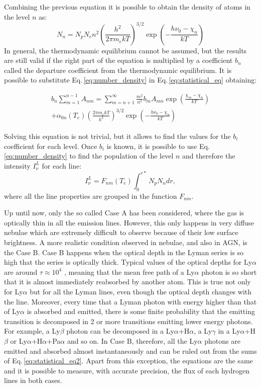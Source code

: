 \documentclass[../main.tex]{subfiles}
\begin{document}
Combining the previous equation it is possible to obtain the density of atoms in the level $n$ as:
\begin{equation}
    \label{eq:number_density}
    N_n = N_pN_en^2\left(\frac{h^2}{2\pi m_e k T}\right)^{3/2} \exp\left(-\frac{h\nu_0 -\chi_n}{kT}\right)
\end{equation}
In general, the thermodynamic equilibrium cannot be assumed, but the results are still valid if the right part of the equation is multiplied by a coefficient $b_n$ called the departure coefficient from the thermodynamic equilibrium. It is possible to substitute Eq.\,\ref{eq:number_density} in Eq.\,\ref{eq:statistical_eq} obtaining:

\begin{multline}
    \label{eq:statistical_eq2}
    b_n \sum\limits_{m=1}^{n-1} A_{nm} = \sum\limits_{m=n+1}^{\infty} \frac{m^2}{n^2}b_m A_{mn} \exp\left(\frac{\chi_m-\chi_n}{kT}\right) \\
    + \alpha_{0n}(T_e)\left(\frac{2\pi m_e kT}{h^2}\right)^{3/2}\exp\left(-\frac{h\nu_0 - \chi_n}{kT}\right)
\end{multline}

Solving this equation is not trivial, but it allows to find the values for the $b_i$ coefficient for each level.
Once $b_i$ is known, it is possible to use Eq.\,\ref{eq:number_density} to find the population of the level $n$ and therefore the intensity $I^L_{\nu}$ for each line:
\begin{equation}
    \label{eq:emission_coef}
    I_{\nu}^L = F_{nm}(T_e)\int_0^{r*}N_pN_ndr,   
\end{equation}
where all the line properties are grouped in the function $F_{nm}$.

Up until now, only the so called Case A has been considered, where the gas is optically thin in all the emission lines.
However, this only happens in very diffuse nebulae which are extremely difficult to observe because of their low surface brightness.
A more realistic condition observed in nebulae, and also in AGN, is the Case B.
Case B happens when the optical depth in the Lyman series is so high that the series is optically thick.
Typical values of the optical depths for Ly$\alpha$ are around $\tau \approx 10^4$ \citep{OsterbrockAGN}, meaning that the mean free path of a Ly$\alpha$ photon is so short that it is almost immediately reabsorbed by another atom. 
This is true not only for Ly$\alpha$ but for all the Lyman lines, even though the optical depth changes with the line.
Moreover, every time that a Lyman photon with energy higher than that of Ly$\alpha$ is absorbed and emitted, there is some finite probability that the emitting transition is decomposed in 2 or more transitions emitting lower energy photons.
For example, a Ly$\beta$ photon can be decomposed in a Ly$\alpha$+H$\alpha$, a Ly$\gamma$ in a Ly$\alpha$+H$\beta$ or Ly$\alpha$+H$\alpha$+Pa$\alpha$ and so on.
In Case B, therefore, all the Ly$\alpha$ photons are emitted and absorbed almost instantaneously and can be ruled out from the sums of Eq.\,\ref{eq:statistical_eq2}.
Apart from this exception, the equations are the same and it is possible to measure, with accurate precision, the flux of each hydrogen lines in both cases.
\end{document}
